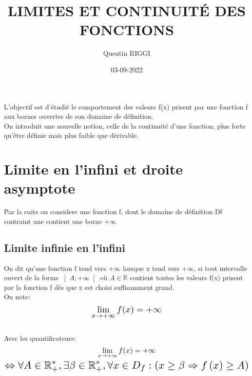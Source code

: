 \documentclass[a4paper, 10pt]{article}
\title{\color{darkred}\Huge LIMITES ET CONTINUITÉ DES FONCTIONS}
\date{03-09-2022}
\author{Quentin RIGGI}
\renewcommand{\large}{\color{text}}
\renewcommand{\textbf}{\color{crimson}}
\begin{document}
	\maketitle
	\large L'objectif est d'étudié le comportement des valeurs f(x) prisent par une fonction f aux bornes ouvertes de son domaine de définition.\\
	\large On introduit une nouvelle notion, celle de la continuité d'une fonction, plus forte qu'être définie mais plus faible que dérivable.
	
	\section{Limite en l'infini et droite asymptote}
	\large Par la suite on considere une fonction f, dont le domaine de définition Df contraint une contient une borne $+ \infty$ 

	\subsection{Limite infinie en l'infini}
	\textbf{Definition:}
	\large On dit qu'une fonction f tend vers +$\infty$ lorsque x tend vers +$\infty$, si tout intervalle ouvert de la forme
	$\left]A; +\infty \right[$ où $A\in\mathbb{R}$ contient toutes les valeurs f(x) prisent par la fonction f dès que x est choisi suffisamment grand.\\
	\large On note:
	\begin{displaymath}
		\scaleto{\lim_{x\to+\infty} f(x) = +\infty}{20pt}
	\end{displaymath}
	\\
	\large Avec les quantificateurs:
	\begin{gather*}
		\scaleto{\lim_{x\to+\infty} f(x) = +\infty}{20pt} 
		\\
		\scaleto{\Leftrightarrow\forall A \in\mathbb{R}_{+}^{*},\exists\beta\in\mathbb{R}_{+}^{*},\forall x \in D_{f} : \left(x\geq\beta\Rightarrow f\left(x\right)\geq A \right)}{20pt}
	\end{gather*}
	
	\begin{center}
	\end{center}
	
\end{document}
